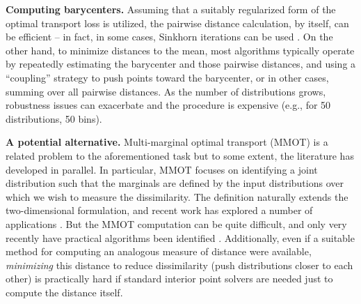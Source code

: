 \textbf{Computing barycenters.}
Assuming that a suitably regularized form of the optimal transport loss is utilized, the pairwise distance 
calculation, by itself, can be efficient -- in fact, 
in some cases, Sinkhorn iterations can be used \citep{cuturi2013sinkhorn}. 
On the other hand, to minimize distances to the mean, 
most algorithms typically operate 
by repeatedly estimating the barycenter and those pairwise distances, and using a ``coupling'' strategy 
to push points toward the barycenter,
or in other cases, summing over all pairwise 
distances. 
As the number of distributions 
grows, robustness issues can exacerbate \citep{alvarez2008trimmed} and the procedure is 
expensive (e.g., for 50 distributions, 50 bins).

\textbf{A potential alternative.}
Multi-marginal optimal transport (MMOT) is a related problem to the aforementioned task but to some extent, the literature has developed in parallel.
In particular, MMOT focuses on identifying a joint distribution such that the marginals are defined by the input distributions over which we wish to measure the dissimilarity.
The definition naturally extends the two-dimensional formulation, and recent work has explored a number of applications \citep{pass2015multi}.
But the MMOT computation can be quite difficult,
and only very recently have practical algorithms been identified \citep{mmotcuturi}.
Additionally, even if a suitable method for computing an analogous measure of distance were available, 
\textit{minimizing} this distance to reduce 
dissimilarity (push distributions closer to each other) is practically hard if standard interior point solvers are needed just to compute the distance itself.

